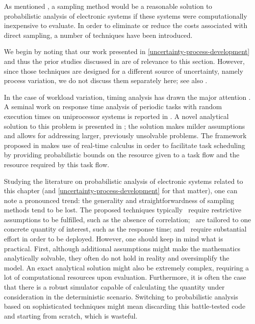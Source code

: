 As mentioned , a sampling method would be a reasonable solution to
probabilistic analysis of electronic systems if these systems were
computationally inexpensive to evaluate. In order to eliminate or reduce the
costs associated with direct sampling, a number of techniques have been
introduced.

We begin by noting that our work presented in
\cref{uncertainty-process-development} and thus the prior studies discussed in
 are of relevance to this section. However, since those
techniques are designed for a different source of uncertainty, namely process
variation, we do not discuss them separately here; see also
.

In the case of workload variation, timing analysis has drawn the major attention
\cite{quinton2012}. A seminal work on response time analysis of periodic tasks
with random execution times on uniprocessor systems is reported in
\cite{diaz2002}. A novel analytical solution to this problem is presented in
\cite{tanasa2015}; the solution makes milder assumptions and allows for
addressing larger, previously unsolvable problems. The framework proposed in
\cite{santinelli2011} makes use of real-time calculus in order to facilitate
task scheduling by providing probabilistic bounds on the resource given to a
task flow and the resource required by this task flow.

Studying the literature on probabilistic analysis of electronic systems related
to this chapter (and \cref{uncertainty-process-development} for that matter),
one can note a pronounced trend: the generality and straightforwardness of
sampling methods tend to be lost. The proposed techniques typically \one~require
restrictive assumptions to be fulfilled, such as the absence of correlation;
\two~are tailored to one concrete quantity of interest, such as the response
time; and \three~require substantial effort in order to be deployed. However,
one should keep in mind what is practical. First, although additional
assumptions might make the mathematics analytically solvable, they often do not
hold in reality and oversimplify the model. An exact analytical solution might
also be extremely complex, requiring a lot of computational resources upon
evaluation. Furthermore, it is often the case that there is a robust simulator
capable of calculating the quantity under consideration in the deterministic
scenario. Switching to probabilistic analysis based on sophisticated techniques
might mean discarding this battle-tested code and starting from scratch, which
is wasteful.

